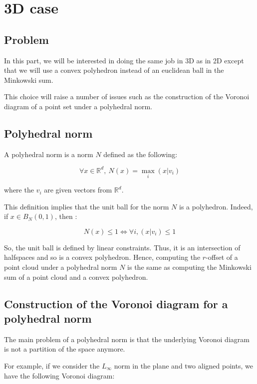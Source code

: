 \chapter{3D case}

\section{Problem}

In this part, we will be interested in doing the same job in 3D as in 2D except
that we will use a convex polyhedron instead of an euclidean ball in the
Minkowski sum.

This choice will raise a number of issues such as the construction of the
Voronoi diagram of a point set under a polyhedral norm.

\section{Polyhedral norm}
A polyhedral norm is a norm $ N $ defined as the following:

$$ \forall x \in \mathbb{R}^d,~ N(x) = \max_{i} (x | v_i) $$

where the $ v_i $ are given vectors from $ \mathbb{R}^d $.

This definition implies that the unit ball for the norm $ N $ is a polyhedron.
Indeed, if $ x \in B_N(0, 1) $, then :

$$ N(x) \leq 1 \Longleftrightarrow \forall i, (x | v_i) \leq 1 $$

So, the unit ball is defined by linear constraints. Thus, it is an intersection
of halfspaces and so is a convex polyhedron. Hence, computing the $ r $-offset
of a point cloud under a polyhedral norm $ N $ is the same as computing the
Minkowski sum of a point cloud and a convex polyhedron.

\section{Construction of the Voronoi diagram for a polyhedral norm}

The main problem of a polyhedral norm is that the underlying Voronoi diagram is
not a partition of the space anymore.

For example, if we consider the $ L_\infty $ norm in the plane and two aligned
points, we have the following Voronoi diagram:

